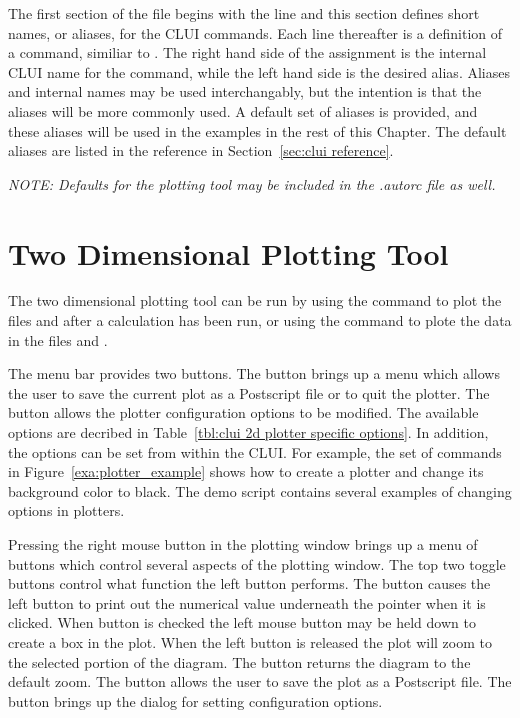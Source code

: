 \documentclass[12pt]{report}
\begin{document}
 The first section of the  file
 begins with the line 
 and this section defines short names, or aliases,
 for the \AUTO CLUI commands.  
 Each line thereafter is a definition of
 a command, similiar to 
 .
 The right hand side of the assignment
 is the internal \AUTO CLUI name for the command,
 while the left hand side is the desired alias.  
 Aliases and
 internal names may be used interchangably, but the
 intention is that the aliases will be more commonly
 used.  A default set of aliases is provided, and
 these aliases will be used in the examples in the
 rest of this Chapter.  The default aliases
 are listed in the reference in Section~\ref{sec:clui reference}.

 {\em NOTE:  Defaults for the plotting tool may be included in
 the .autorc file as well.}

 \section{ Two Dimensional Plotting Tool}\label{clui:2d plotting}

 The two dimensional plotting tool can be run by using the command
  to plot the files  and 
 after a calculation has been run, or using the command
  to plote the data in the
 files  and .  

 The menu bar provides two buttons.  The 
 button brings up a menu which allows the user to save
 the current plot as a Postscript file or
 to quit the plotter.
 The  button allows the plotter
 configuration options to be modified.
 The available options are decribed in
 Table~\ref{tbl:clui 2d plotter specific options}.  In addition, the options can 
 be set from within the CLUI.  For example,
 the set of commands in Figure~\ref{exa:plotter_example} shows how to
 create a plotter and change its background color to black.  The
 demo script  contains several
 examples of changing options in plotters.

 Pressing the right mouse button in the plotting window brings
 up a menu of buttons which control several aspects
 of the plotting window.  The top two toggle buttons
 control what function the left button performs.  
 The  button causes the
 left button to print out the numerical value underneath
 the pointer when it is clicked.
 When  button is checked the left
 mouse button may be held down to create
 a box in the plot.  When the left button
 is released the plot will zoom to the selected
 portion of the diagram.
 The  button returns the
 diagram to the default zoom. 
 The  button allows the user
 to save the plot as a Postscript file.
 The  button brings up
 the dialog for setting configuration options.
\end{document}
